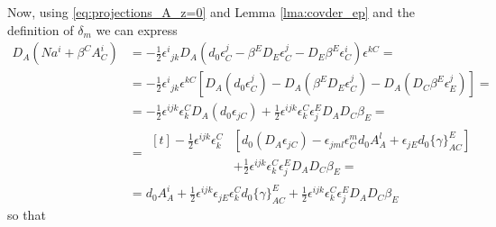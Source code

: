 \documentclass[a4paper, 11pt]{article}
\def\be{\beta}
\def\ga{\gamma}
\def\de{\delta}
\def\ep{\epsilon}
\def\chr#1#2#3#4{\{#1\}^#2_{#3 #4}}
\newif\ifhide
\def\eatrow#1{}
\def\showrow#1{& #1\\}
\def\Hide#1{\ifhide
  \expandafter\eatrow
\else
  \expandafter\showrow
\fi{#1}}
\numberwithin{equation}{section}
\begin{document}
Now, using \eqref{eq:projections_A_z=0} and Lemma \ref{lma:covder_ep} and the definition of $\de_m$ we can express 
\begin{align*}
    D_A(Na^i + \be^C A^i_C) &= -\tfrac 1 2 \ep^i{}_{jk}D_A\left(d_0 \ep^j_C - \be^E D_E \ep^j_C - D_E \be^E \ep^i_C\right)\ep^{kC} = \\ 
    &=  -\tfrac 1 2 \ep^i{}_{jk}\ep^{kC}\left[D_A(d_0 \ep^j_C)- D_A(\be^E D_E \ep^j_C )- D_A(D_C \be^E \ep^j_E)\right]  = \\ 
    \Hide{= -\tfrac 1 2 \ep^{ijk} \ep_k^C D_A(d_0 \ep_{jC})  + \tfrac 1 2 \ep^{ijk} \ep_k^C \ep_j^E D_A D_C \be_E =} 
    \Hide{= \begin{aligned}[t]
        -\tfrac 1 2 \ep^{ijk} \ep^C_k &\left[d_0(D_A \ep_{jC}) - \ep_{jml}\ep^m_C d_0 A^l_A + \ep_{jE} d_0\chr \ga E AC\right]  \\ & + \tfrac 1 2 \ep^{ijk} \ep_k^C \ep_j^E D_A D_C \be_E =
    \end{aligned}
        }
    &= d_0 A^i_A + \tfrac 1 2 \ep^{ijk} \ep_{jE}\ep_k^C d_0 \chr \ga E AC + \tfrac 1 2 \ep^{ijk} \ep_k^C \ep_j^E D_A D_C \be_E
\end{align*}
so that 
\end{document}
